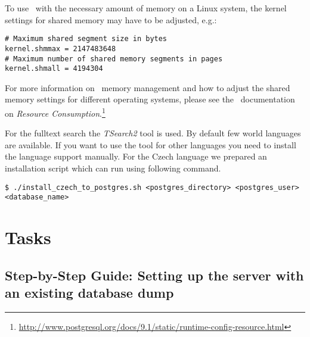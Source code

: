 To use \postgres~with the necessary amount of memory on a Linux system, the kernel settings for shared memory may have to be adjusted, e.g.:

\vspace*{0.5em}
\begin{lstlisting}
# Maximum shared segment size in bytes
kernel.shmmax = 2147483648
# Maximum number of shared memory segments in pages
kernel.shmall = 4194304
\end{lstlisting}
\vspace*{0.5em}

For more information on \postgres~memory management and how to adjust the shared memory settings for different operating systems, please see the \postgres~documentation on \emph{Resource Consumption}.\footnote{\url{http://www.postgresql.org/docs/9.1/static/runtime-config-resource.html}}

For the fulltext search the \emph{TSearch2} tool is used. By default few world languages are available. If you want to use the tool for other languages you need to install the language support manually. For the Czech language we prepared an installation script which can run using following command.

\vspace*{0.5em}
\begin{lstlisting}
$ ./install_czech_to_postgres.sh <postgres_directory> <postgres_user> <database_name>
\end{lstlisting}
\vspace*{0.5em}


\section{Tasks}

\subsection{Step-by-Step Guide: Setting up the server with an existing database dump}

